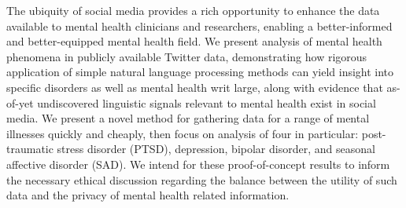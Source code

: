 The ubiquity of social media provides a rich opportunity to enhance the data available to mental health clinicians and researchers, enabling a better-informed and better-equipped mental health field. We present analysis of mental health phenomena in publicly available Twitter data, demonstrating how rigorous application of simple natural language processing methods can yield insight into specific disorders as well as mental health writ large, along with evidence that as-of-yet undiscovered linguistic signals relevant to mental health exist in social media. We present a novel method for gathering data for a range of mental illnesses quickly and cheaply, then focus on analysis of four in particular: post-traumatic stress disorder (PTSD), depression, bipolar disorder,  and seasonal affective disorder (SAD). We intend for these proof-of-concept results to inform the necessary ethical discussion regarding the balance between the utility of such data and the privacy of mental health related information.
